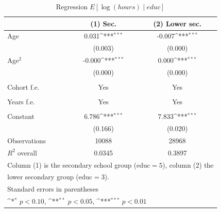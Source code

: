 \begin{table}[htbp]\centering
\def\sym#1{\ifmmode^{#1}\else\(^{#1}\)\fi}
\caption{Regression \(E[\log(hours)\mid educ]\) \label{Tab:reg3}}
\begin{tabular}{l*{2}{c}}
\toprule
                    &\multicolumn{1}{c}{(1) Sec.\label{Reg:3_h}}         &\multicolumn{1}{c}{(2) Lower sec.\label{Reg:3_l}}         \\
\midrule
Age                 &       0.031\sym{***}&      -0.007\sym{***}\\
                    &     (0.003)         &     (0.000)         \\
\addlinespace
Age\(^2\)           &      -0.000\sym{***}&       0.000\sym{***}\\
                    &     (0.000)         &     (0.000)         \\
\\
Cohort f.e.          &       Yes        &      Yes \\
                            \\
\addlinespace
Years f.e.            &       Yes         &       Yes         \\
                           \\
\addlinespace
Constant            &       6.786\sym{***}&       7.833\sym{***}\\
                    &     (0.166)         &     (0.020)         \\
\midrule
Observations        &       10088         &       28968         \\
$R^2$ overall       &   0.0345&0.3897 \\
\bottomrule
\multicolumn{3}{l}{\footnotesize Column (1) is the secondary school group (educ\(=5\)), column (2) the}\\
\multicolumn{3}{l}{\footnotesize lower secondary group (educ\(=3\)).}\\
\multicolumn{3}{l}{\footnotesize Standard errors in parentheses}\\
\multicolumn{3}{l}{\footnotesize \sym{*} \(p<0.10\), \sym{**} \(p<0.05\), \sym{***} \(p<0.01\)}\\
\end{tabular}
\end{table}
